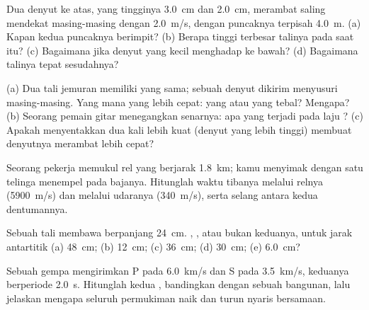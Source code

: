 \begin{exercise}[$\star\star$]\label{exo:g12:mechanical-waves:7}
Dua denyut ke atas, yang tingginya \qty{3.0}{cm} dan \qty{2.0}{cm},
merambat saling mendekat masing-masing dengan \qty{2.0}{m/s}, dengan
puncaknya terpisah \qty{4.0}{m}. (a) Kapan kedua puncaknya berimpit?
(b) Berapa tinggi terbesar talinya pada saat itu? (c) Bagaimana jika
denyut yang kecil menghadap ke bawah? (d) Bagaimana talinya tepat
sesudahnya?
\end{exercise}

\begin{exercise}[$\star\star$]\label{exo:g12:mechanical-waves:8}
(a) Dua tali jemuran memiliki  yang sama; sebuah denyut dikirim
menyusuri masing-masing. Yang mana yang lebih cepat: yang  atau
yang tebal? Mengapa? (b) Seorang pemain gitar menegangkan senarnya: apa
yang terjadi pada laju ? (c) Apakah menyentakkan dua kali
lebih kuat (denyut yang lebih tinggi) membuat denyutnya merambat lebih
cepat?
\end{exercise}

\begin{exercise}[$\star\star$]\label{exo:g12:mechanical-waves:9}
Seorang pekerja memukul rel yang berjarak \qty{1.8}{km}; kamu menyimak
dengan satu telinga menempel pada bajanya. Hitunglah waktu tibanya
melalui relnya (\qty{5900}{m/s}) dan melalui udaranya (\qty{340}{m/s}),
serta selang antara kedua dentumannya.
\end{exercise}

\begin{exercise}[$\star\star$]\label{exo:g12:mechanical-waves:10}
Sebuah tali membawa  berpanjang  \qty{24}{cm}.
, , atau bukan keduanya, untuk jarak antartitik
(a) \qty{48}{cm}; (b) \qty{12}{cm}; (c) \qty{36}{cm}; (d) \qty{30}{cm};
(e) \qty{6.0}{cm}?
\end{exercise}

\begin{exercise}[$\star\star$]\label{exo:g12:mechanical-waves:11}
Sebuah gempa mengirimkan  P pada \qty{6.0}{km/s} dan 
S pada \qty{3.5}{km/s}, keduanya berperiode \qty{2.0}{s}. Hitunglah
kedua , bandingkan dengan sebuah bangunan, lalu
jelaskan mengapa seluruh permukiman naik dan turun nyaris bersamaan.
\end{exercise}

